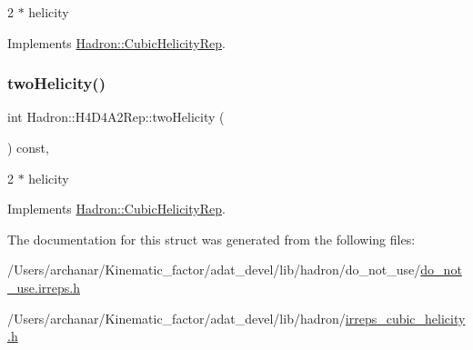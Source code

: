 2 $\ast$ helicity 

Implements \mbox{\hyperlink{structHadron_1_1CubicHelicityRep_af507aa56fc2747eacc8cb6c96db31ecc}{Hadron\+::\+Cubic\+Helicity\+Rep}}.

\mbox{\label{structHadron_1_1H4D4A2Rep_a6ea29d2750a22f6ef02172b0482e32e5}} 
\subsubsection{\texorpdfstring{twoHelicity()}{twoHelicity()}\hspace{0.1cm}{\footnotesize\ttfamily [2/2]}}
{\footnotesize\ttfamily int Hadron\+::\+H4\+D4\+A2\+Rep\+::two\+Helicity (\begin{DoxyParamCaption}{ }\end{DoxyParamCaption}) const\hspace{0.3cm}{\ttfamily [inline]}, {\ttfamily [virtual]}}

2 $\ast$ helicity 

Implements \mbox{\hyperlink{structHadron_1_1CubicHelicityRep_af507aa56fc2747eacc8cb6c96db31ecc}{Hadron\+::\+Cubic\+Helicity\+Rep}}.



The documentation for this struct was generated from the following files\+:\begin{DoxyCompactItemize}
\item 
/\+Users/archanar/\+Kinematic\+\_\+factor/adat\+\_\+devel/lib/hadron/do\+\_\+not\+\_\+use/\mbox{\hyperlink{do__not__use_8irreps_8h}{do\+\_\+not\+\_\+use.\+irreps.\+h}}\item 
/\+Users/archanar/\+Kinematic\+\_\+factor/adat\+\_\+devel/lib/hadron/\mbox{\hyperlink{lib_2hadron_2irreps__cubic__helicity_8h}{irreps\+\_\+cubic\+\_\+helicity.\+h}}\end{DoxyCompactItemize}
